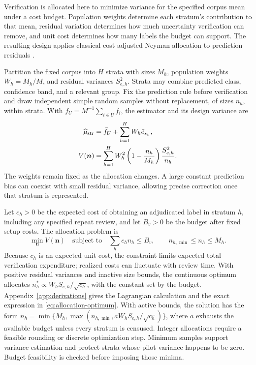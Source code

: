 \documentclass[11pt,a4paper]{article}
\begin{document}
Verification is allocated here to minimize variance for the specified corpus mean under a cost budget. Population weights determine each stratum's contribution to that mean, residual variation determines how much uncertainty verification can remove, and unit cost determines how many labels the budget can support. The resulting design applies classical cost-adjusted Neyman allocation to prediction residuals \citep{sarndal1992}.

Partition the fixed corpus into $H$ strata with sizes $M_h$, population weights $W_h=M_h/M$, and residual variances $S_{e,h}^{2}$. Strata may combine predicted class, confidence band, and a relevant group. Fix the prediction rule before verification and draw independent simple random samples without replacement, of sizes $n_h$, within strata. With $\bar f_U=M^{-1}\sum_{i\in U}f_i$, the estimator and its design variance are
\begin{align}
 \widehat\mu_{\mathrm{str}}&=\bar f_U+\sum_{h=1}^{H}W_h\bar e_{s_h},\notag\\
 V(\boldsymbol n)&=\sum_{h=1}^{H}W_h^2
       \left(1-\frac{n_h}{M_h}\right)\frac{S_{e,h}^{2}}{n_h}.
 \label{eq:stratified-variance}
\end{align}
The weights remain fixed as the allocation changes. A large constant prediction bias can coexist with small residual variance, allowing precise correction once that stratum is represented.

Let $c_h>0$ be the expected cost of obtaining an adjudicated label in stratum $h$, including any specified repeat review, and let $B_v>0$ be the budget after fixed setup costs. The allocation problem is
\begin{equation}
 \min_{\boldsymbol n}V(\boldsymbol n)
 \quad\text{subject to}\quad
 \sum_h c_h n_h\leq B_v,\qquad n_{h,\min}\leq n_h\leq M_h.
 \label{eq:allocation-problem}
\end{equation}
Because $c_h$ is an expected unit cost, the constraint limits expected total verification expenditure; realized costs can fluctuate with review time.
With positive residual variances and inactive size bounds, the continuous optimum allocates $n_h^*\propto W_hS_{e,h}/\sqrt{c_h}$, with the constant set by the budget. Appendix~\ref{app:derivations} gives the Lagrangian calculation and the exact expression in \eqref{eq:allocation-optimum}.
With active bounds, the solution has the form
$n_h=\min\{M_h,\max(n_{h,\min},aW_hS_{e,h}/\sqrt{c_h})\}$,
where $a$ exhausts the available budget unless every stratum is censused. Integer allocations require a feasible rounding or discrete optimization step. Minimum samples support variance estimation and protect strata whose pilot variance happens to be zero. Budget feasibility is checked before imposing those minima.
\end{document}

